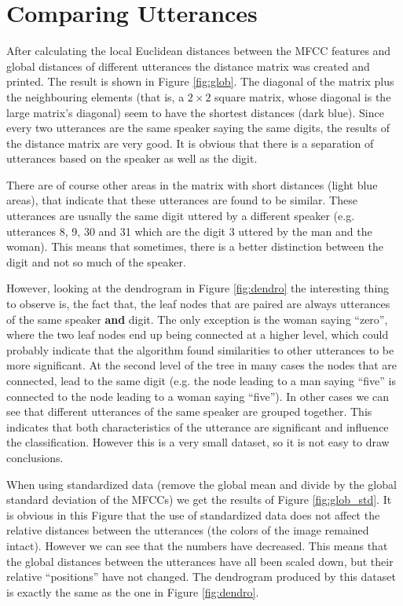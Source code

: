 \documentclass[12pt,a4paper,oneside]{article}
\begin{document}
\section{Comparing Utterances}
After calculating the local Euclidean distances between the MFCC features and global distances of different utterances the distance matrix was created and printed. The result is shown in Figure \ref{fig:glob}. The diagonal of the matrix plus the neighbouring elements (that is, a $2 \times 2$ square matrix, whose diagonal is the large matrix's diagonal) seem to have the shortest distances (dark blue). Since every two utterances are the same speaker saying the same digits, the results of the distance matrix are very good. It is obvious that there is a separation of utterances based on the speaker as well as the digit.

There are of course other areas in the matrix with short distances (light blue areas), that indicate that these utterances are found to be similar. These utterances are usually the same digit uttered by a different speaker (e.g. utterances 8, 9, 30 and 31 which are the digit 3 uttered by the man and the woman). This means that sometimes, there is a better distinction between the digit and not so much of the speaker.

However, looking at the dendrogram in Figure \ref{fig:dendro} the interesting thing to observe is, the fact that, the leaf nodes that are paired are always utterances of the same speaker \textbf{and} digit. The only exception is the woman saying ``zero'', where the two leaf nodes end up being connected at a higher level, which could probably indicate that the algorithm found similarities to other utterances to be more significant. At the second level of the tree in many cases the nodes that are connected, lead to the same digit (e.g. the node leading to a man saying ``five'' is connected to the node leading to a woman saying ``five''). In other cases we can see that different utterances of the same speaker are grouped together. This indicates that both characteristics of the utterance are significant and influence the classification. However this is a very small dataset, so it is not easy to draw conclusions.

When using standardized data (remove the global mean and divide by the global standard deviation of the MFCCs) we get the results of Figure \ref{fig:glob_std}. It is obvious in this Figure that the use of standardized data does not affect the relative distances between the utterances (the colors of the image remained intact). However we can see that the numbers have decreased. This means that the global distances between the utterances have all been scaled down, but their relative ``positions'' have not changed. The dendrogram produced by this dataset is exactly the same as the one in Figure \ref{fig:dendro}.
\end{document}
